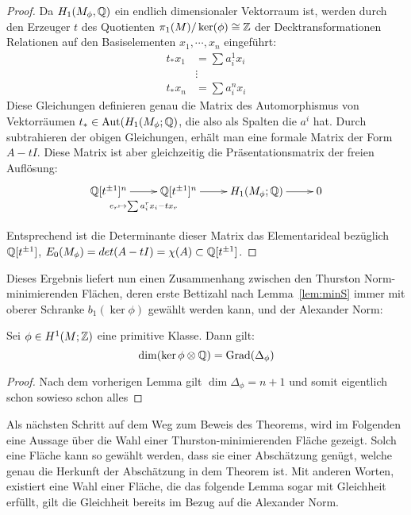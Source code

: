 \begin{proof}
	Da $H_1(M_\phi,\mathbb{Q})$ ein endlich dimensionaler Vektorraum ist, werden durch den Erzeuger $t$ des Quotienten $\pi_1(M)/\ker(\phi) \cong \mathbb{Z}$ der Decktransformationen Relationen auf den Basiselementen $x_1,\cdots,x_n$ eingeführt:	
	\begin{align*}
		t_*x_1 &= \sum a_i^1 x_i \\
				&\vdots \\
		t_*x_n &= \sum a_i^n x_i
	\end{align*}
	Diese Gleichungen definieren genau die Matrix des Automorphismus von Vektorräumen $t_* \in \operatorname{Aut} (H_1(M_\phi;\mathbb{Q})$, die also als Spalten die $a^i$ hat. Durch subtrahieren der obigen Gleichungen, erhält man eine formale Matrix der Form $A-tI$. Diese Matrix ist aber gleichzeitig die Präsentationsmatrix der freien Auflösung:
	\[
		\begin{xy}
			\xymatrix@L+5pt{\laurent \QQ t ^n \ar[r]_{e_r\mapsto \sum a_i^rx_i-tx_r} & \laurent \QQ t ^n \ar[r] & H_1(M_\phi;\QQ) \ar[r] &0\\}
		\end{xy}
	\]
	Entsprechend ist die Determinante dieser Matrix das Elementarideal bezüglich $\mathbb{Q}[t^{\pm 1}]$, $E_0(M_\phi)=det(A-tI)=\chi(A) \subset \mathbb{Q}[t^{\pm 1}] $. 
\end{proof}

Dieses Ergebnis liefert nun einen Zusammenhang zwischen den Thurston Norm-minimierenden Flächen, deren erste Bettizahl nach Lemma~\ref{lem:minS} immer mit oberer Schranke $b_1(\ker\phi)$ gewählt werden kann, und der Alexander Norm:
\begin{cor}
	Sei $\phi \in H^1(M;\mathbb{Z})$ eine primitive Klasse. Dann gilt:
	\[
		\dim(\ker\phi \otimes \mathbb{Q}) = \operatorname{Grad}(\Delta_\phi) 
	\]
\end{cor}
\begin{proof}
	Nach dem vorherigen Lemma gilt $\dim \Delta_\phi = n+1$ und somit %
	eigentlich schon sowieso schon alles 
\end{proof}




Als nächsten Schritt auf dem Weg zum Beweis des Theorems, wird im Folgenden eine Aussage über die Wahl einer Thurston-minimierenden Fläche gezeigt. Solch eine Fläche kann so gewählt werden, dass sie einer Abschätzung genügt, welche genau die Herkunft der Abschätzung in dem Theorem ist. Mit anderen Worten, existiert eine Wahl einer Fläche, die das folgende Lemma sogar mit Gleichheit erfüllt, gilt die Gleichheit bereits im Bezug auf die Alexander Norm.


